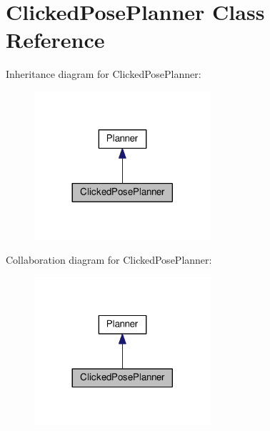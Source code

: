 \hypertarget{classClickedPosePlanner}{}\section{Clicked\+Pose\+Planner Class Reference}
\label{classClickedPosePlanner}


Inheritance diagram for Clicked\+Pose\+Planner\+:\nopagebreak
\begin{figure}[H]
\begin{center}
\leavevmode
\includegraphics[width=185pt]{d8/d29/classClickedPosePlanner__inherit__graph}
\end{center}
\end{figure}


Collaboration diagram for Clicked\+Pose\+Planner\+:\nopagebreak
\begin{figure}[H]
\begin{center}
\leavevmode
\includegraphics[width=185pt]{d5/d50/classClickedPosePlanner__coll__graph}
\end{center}
\end{figure}
